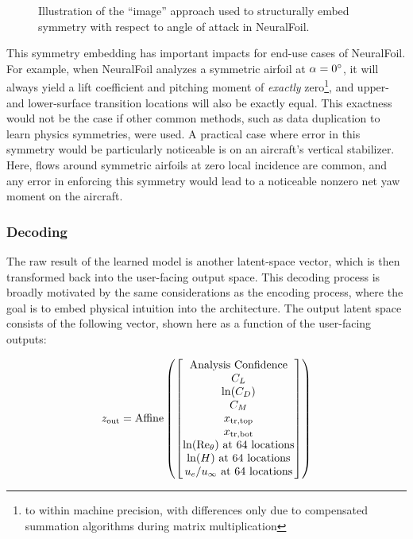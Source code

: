 \documentclass[journal]{new-aiaa}
\begin{document}
\begin{figure}[H]
    \centering
    
    \caption{Illustration of the ``image'' approach used to structurally embed symmetry with respect to angle of attack in NeuralFoil.}
    \label{fig:alpha_symmetry}
\end{figure}

This symmetry embedding has important impacts for end-use cases of NeuralFoil. For example, when NeuralFoil analyzes a symmetric airfoil at $\alpha=0\degree$, it will always yield a lift coefficient and pitching moment of \textit{exactly} zero\footnote{to within machine precision, with differences only due to compensated summation algorithms during matrix multiplication}, and upper- and lower-surface transition locations will also be exactly equal. This exactness would not be the case if other common methods, such as data duplication to learn physics symmetries, were used. A practical case where error in this symmetry would be particularly noticeable is on an aircraft's vertical stabilizer. Here, flows around symmetric airfoils at zero local incidence are common, and any error in enforcing this symmetry would lead to a noticeable nonzero net yaw moment on the aircraft.

\subsubsection{Decoding}

The raw result of the learned model is another latent-space vector, which is then transformed back into the user-facing output space. This decoding process is broadly motivated by the same considerations as the encoding process, where the goal is to embed physical intuition into the architecture. The output latent space consists of the following vector, shown here as a function of the user-facing outputs:

\begin{equation}
    z_{\rm out} = \text{Affine}\left( \begin{bmatrix}
            \text{Analysis Confidence}               \\
            C_L                                      \\
            \ln(C_D)                                 \\
            C_M                                      \\
            x_{\rm tr, top}                          \\
            x_{\rm tr, bot}                          \\
            \ln(\rm Re_\theta) \text{ at 64 locations} \\
            \ln(H) \text{ at 64 locations}           \\
            u_e/u_\infty \text{ at 64 locations}     \\
        \end{bmatrix} \right)
    \label{eq:decoding}
\end{equation}
\end{document}
